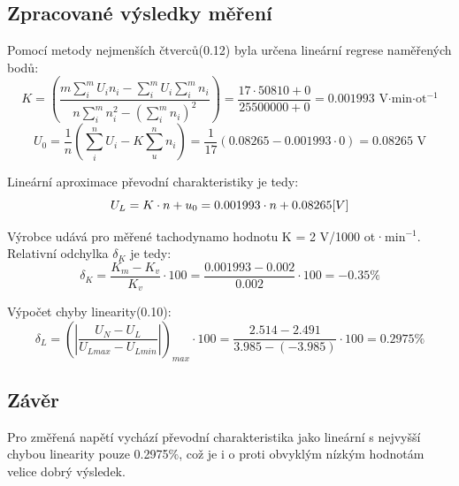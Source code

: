 \documentclass{protokol}
\begin{document}
    \subsection{Zpracované výsledky měření}
        Pomocí metody nejmenších čtverců\cite{vypocty}(0.12) byla určena lineární regrese naměřených bodů:
        \begin{equation}
            K = \left( \dfrac{m \sum_{i}^{m} U_i n_i - \sum_{i}^{m} U_i \sum_{i}^{m} n_i }{n \sum_{i}^{m} n_i^2 - \left(\sum_{i}^{m} n_i \right)^2} \right) = \dfrac{17 \cdot 50810 + 0}{25500000 + 0} = 0.001993 \text{ V·min·ot$^{-1}$}
        \end{equation}
        \begin{equation}
            U_0 = \dfrac{1}{n} \left( \sum_{i}^{n} U_i - K \sum_{u}^{n} n_i\right) = \dfrac{1}{17} \left( 0.08265 - 0.001993 \cdot 0 \right) = 0.08265 \text{ V}
        \end{equation}

        Lineární aproximace převodní charakteristiky je tedy:
        \begin{equation}
            U_L = K\cdot n + u_0 = 0.001993 \cdot n + 0.08265 \text[ V]
        \end{equation}

        Výrobce udává pro měřené tachodynamo hodnotu K = 2 V/1000 ot·min$^{-1}$\cite{navod}. Relativní odchylka $\delta_K$ je tedy:
        \begin{equation}
            \delta_K = \dfrac{K_{m} - K_v}{K_v} \cdot 100 = \dfrac{0.001993 - 0.002}{0.002} \cdot 100  = -0.35\%
        \end{equation}

        Výpočet chyby linearity\cite{vypocty}(0.10):
        \begin{equation}
            \delta_L = \left( \left| \dfrac{U_N - U_L}{U_{Lmax} - U_{Lmin}} \right| \right)_{max} \cdot 100  = \dfrac{2.514 - 2.491}{3.985 - (-3.985)} \cdot 100 = 0.2975\%
        \end{equation}
        \linebreak
    \subsection{Závěr}
        Pro změřená napětí vychází převodní charakteristika jako lineární s nejvyšší chybou linearity pouze 0.2975$\%$, což je i o proti obvyklým nízkým hodnotám velice dobrý výsledek.
        
\end{document}
